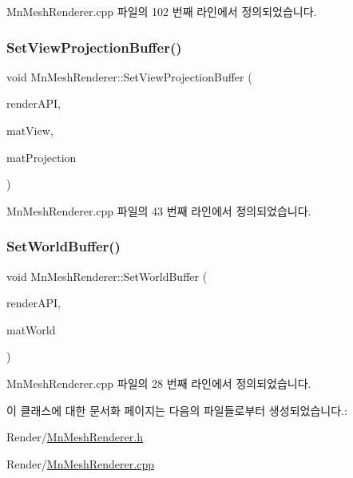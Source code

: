 Mn\+Mesh\+Renderer.\+cpp 파일의 102 번째 라인에서 정의되었습니다.

\mbox{\label{class_m_n_l_1_1_mn_mesh_renderer_abc60188e28b29f0354aa2ed5ba17fc82}} 
\subsubsection{\texorpdfstring{Set\+View\+Projection\+Buffer()}{SetViewProjectionBuffer()}}
{\footnotesize\ttfamily void Mn\+Mesh\+Renderer\+::\+Set\+View\+Projection\+Buffer (\begin{DoxyParamCaption}\item[{\hyperlink{class_m_n_l_1_1_mn_render_a_p_i}{Mn\+Render\+A\+PI} \&}]{render\+A\+PI,  }\item[{const Direct\+X\+::\+Simple\+Math\+::\+Matrix \&}]{mat\+View,  }\item[{const Direct\+X\+::\+Simple\+Math\+::\+Matrix \&}]{mat\+Projection }\end{DoxyParamCaption})}



Mn\+Mesh\+Renderer.\+cpp 파일의 43 번째 라인에서 정의되었습니다.

\mbox{\label{class_m_n_l_1_1_mn_mesh_renderer_afe78f898609c98523fa7cb1efa52c68f}} 
\subsubsection{\texorpdfstring{Set\+World\+Buffer()}{SetWorldBuffer()}}
{\footnotesize\ttfamily void Mn\+Mesh\+Renderer\+::\+Set\+World\+Buffer (\begin{DoxyParamCaption}\item[{\hyperlink{class_m_n_l_1_1_mn_render_a_p_i}{Mn\+Render\+A\+PI} \&}]{render\+A\+PI,  }\item[{const Direct\+X\+::\+Simple\+Math\+::\+Matrix \&}]{mat\+World }\end{DoxyParamCaption})}



Mn\+Mesh\+Renderer.\+cpp 파일의 28 번째 라인에서 정의되었습니다.



이 클래스에 대한 문서화 페이지는 다음의 파일들로부터 생성되었습니다.\+:\begin{DoxyCompactItemize}
\item 
Render/\hyperlink{_mn_mesh_renderer_8h}{Mn\+Mesh\+Renderer.\+h}\item 
Render/\hyperlink{_mn_mesh_renderer_8cpp}{Mn\+Mesh\+Renderer.\+cpp}\end{DoxyCompactItemize}
